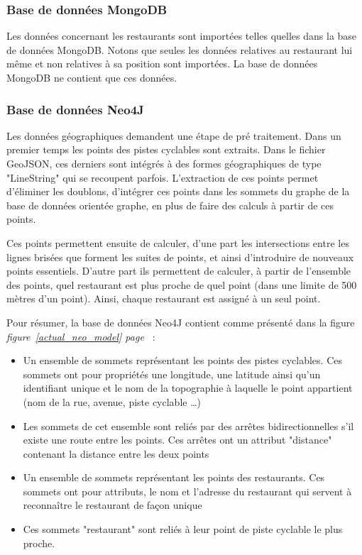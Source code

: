 \documentclass[12pt]{article}
\begin{document}
\subsubsection{Base de données MongoDB}

    Les données concernant les restaurants sont importées telles quelles dans la base de données MongoDB. Notons que seules les données relatives au restaurant lui même et non relatives à sa position sont importées. La base de données MongoDB ne contient que ces données.

\subsubsection{Base de données Neo4J}

    Les données géographiques demandent une étape de pré traitement. Dans un premier temps les points des pistes cyclables sont extraits. Dans le fichier GeoJSON, ces derniers sont intégrés à des formes géographiques de type "LineString" qui se recoupent parfois. L'extraction de ces points permet d'éliminer les doublons, d'intégrer ces points dans les sommets du graphe de la base de données orientée graphe, en plus de faire des calculs à partir de ces points.

    Ces points permettent ensuite de calculer, d'une part les intersections entre les lignes brisées que forment les suites de points, et ainsi d'introduire de nouveaux points essentiels. D'autre part ils permettent de calculer, à partir de l'ensemble des points, quel restaurant est plus proche de quel point (dans une limite de 500 mètres d'un point). Ainsi, chaque restaurant est assigné à un seul point.
    
    Pour résumer, la base de données Neo4J contient comme présenté dans la figure \emph{figure~\ref{actual_neo_model} page~\pageref{actual_neo_model}} :

    \begin{itemize}
        \item Un ensemble de sommets représentant les points des pistes cyclables. Ces sommets ont pour propriétés une longitude, une latitude ainsi qu'un identifiant unique et le nom de la topographie à laquelle le point appartient (nom de la rue, avenue, piste cyclable \dots)
        \item Les sommets de cet ensemble sont reliés par des arrêtes bidirectionnelles s'il existe une route entre les points. Ces arrêtes ont un attribut "distance" contenant la distance entre les deux points
        \item Un ensemble de sommets représentant les points des restaurants. Ces sommets ont pour attributs, le nom et l'adresse du restaurant qui servent à reconnaître le restaurant de façon unique
        \item Ces sommets "restaurant" sont reliés à leur point de piste cyclable le plus proche.
    \end{itemize}
        
\end{document}
